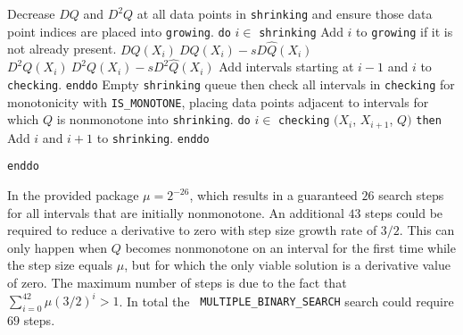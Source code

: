 {\itemitem{} Decrease $DQ$ and $D^2Q$ at all data points in {\tt shrinking} and
  ensure those data point indices are placed into {\tt growing}.
\itemitem{} {\tt do} $i \in$ {\tt shrinking}
\itemitem{} \codent Add $i$ to {\tt growing} if it is not already present.
\itemitem{} \codent $DQ(X_i) \: DQ(X_i) - s D\hat Q(X_i)$
\itemitem{} \codent $D^2Q(X_i) \: D^2Q(X_i) - s D^2\hat Q(X_i)$
\itemitem{} \codent Add intervals starting at $i-1$ and $i$ to {\tt checking}.
\itemitem{} {\tt enddo}
\itemitem{} {Empty {\tt shrinking} queue then check all intervals in
  {\tt checking} for monotonicity with {\tt IS\_MONOTONE}, placing
  data points adjacent to intervals for which $Q$ is nonmonotone into
  {\tt shrinking}.}
\itemitem{} {\tt do} $i \in$ {\tt checking}
\itemitem{} $\bigl( X_i$, $X_{i+1}$, $Q \bigr)$ {\tt then}
\itemitem{} \codent \codent Add $i$ and $i+1$ to {\tt shrinking}.
\itemitem{} 
\itemitem{} {\tt enddo}
\item{} {\tt enddo }
}
\vskip 5mm



In the provided package $\mu = 2^{-26}$, which results in a guaranteed
$26$ search steps for all intervals that are initially nonmonotone. An
additional $43$ steps could be required to reduce a derivative to zero
with step size growth rate of $3/2$. This can only happen when $Q$
becomes nonmonotone on an interval for the first time while the step
size equals $\mu$, but for which the only viable solution is a
derivative value of zero. The maximum number of steps is due to the
fact that $\sum_{i=0}^{42} \mu (3/2)^i > 1$. In total the {\tt
  MULTIPLE\_BINARY\_SEARCH} search could require $69$ steps.
